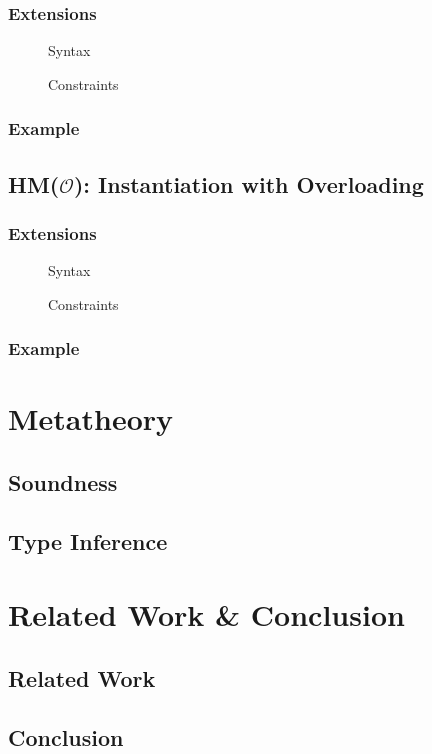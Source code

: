 \documentclass[runningheads]{llncs}
\newcommand{\hmo}{HM($\mathcal{O}$)}
\begin{document}
\subsubsection{Extensions}
\begin{figure}[t]
  \centering
  \caption{Syntax}
\end{figure}
\begin{figure}[t]
  \centering
  \caption{Constraints}
\end{figure}
\subsubsection{Example}
\subsection{\hmo{}: Instantiation with Overloading}
\subsubsection{Extensions}
\begin{figure}[t]
  \centering
  \caption{Syntax}
\end{figure}
\begin{figure}[t]
  \centering
  \caption{Constraints}
\end{figure}
\subsubsection{Example}
\section{Metatheory}
\subsection{Soundness}
\subsection{Type Inference}
\section{Related Work \& Conclusion}
\subsection{Related Work}
\subsection{Conclusion}

\nocite{hmx}
\nocite{sts}
\nocite{atapl}
\printbibliography{}
\end{document}
